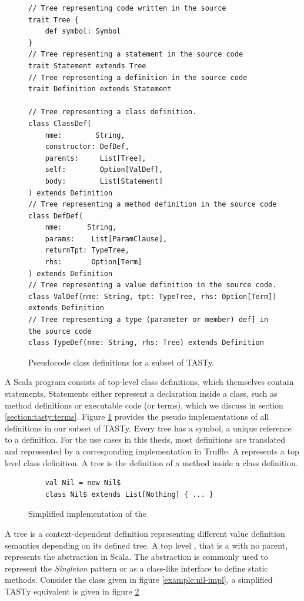 \begin{figure}[H]
\begin{verbatim}
// Tree representing code written in the source
trait Tree {
	def symbol: Symbol
} 
// Tree representing a statement in the source code                        
trait Statement extends Tree       
// Tree representing a definition in the source code
trait Definition extends Statement 
	
// Tree representing a class definition.
class ClassDef(
	nme:        String,
	constructor: DefDef, 
	parents:     List[Tree], 
	self:        Option[ValDef], 
	body:        List[Statement]
) extends Definition
// Tree representing a method definition in the source code
class DefDef(
	nme:      String, 
	params:    List[ParamClause], 
	returnTpt: TypeTree, 
	rhs:       Option[Term]
) extends Definition
// Tree representing a value definition in the source code.
class ValDef(nme: String, tpt: TypeTree, rhs: Option[Term]) extends Definition
// Tree representing a type (parameter or member) def] in the source code
class TypeDef(nme: String, rhs: Tree) extends Definition
\end{verbatim} 
\caption{Pseudocode class definitions for a subset of TASTy.}
\label{tasty:defs}
\end{figure}

A Scala program consists of top-level class definitions, which themselves contain statements.
Statements either represent a declaration inside a class, such as method definitions or executable code (or terms), which we discuss in section \ref{section:tasty:terms}.
Figure \ref{tasty:defs} provides the pseudo implementations of all definitions in our subset of TASTy.
Every tree has a symbol, a unique reference to a definition.
For the use cases in this thesis, most definitions are translated and represented by a corresponding implementation in Truffle.
A  represents a top level class definition.
A  tree is the definition of a method inside a class definition.

\begin{figure}[!htb]
	\begin{verbatim}
	val Nil = new Nil$
	class Nil$ extends List[Nothing] { ... }
	\end{verbatim} 
	\caption{Simplified implementation of the }
	\label{example:decomp-object}
\end{figure}

A  tree is a context-dependent definition representing different value definition semantics depending on its defined tree.
A top level , that is a  with no parent, represents the  abstraction in Scala.
The  abstraction is commonly used to represent the \textit{Singleton} pattern\cite{go4:design-patterns} or as a class-like interface to define static methods.
Consider the  class given in figure \ref{example:nil-impl}, a simplified TASTy equivalent is given in figure \ref{example:decomp-object}

